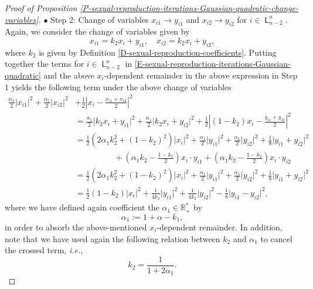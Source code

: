 \documentclass[reqno]{amsart}
\DeclareMathOperator{\Level}{\mathsf{L}}
\numberwithin{equation}{section}
\begin{document}
{\begin{proof}[Proof of Proposition \ref{P-sexual-reproduction-iterations-Gaussian-quadratic-change-variables}]
$\bullet$ {\sc Step 2}: Change of variables $x_{i1}\rightarrow y_{i1}$ and $x_{i2}\rightarrow y_{i2}$ for $i\in \Level_{n-2}^n$.\\
Again, we consider the change of variables given by
$$
x_{i1}=k_2x_i+y_{i1},\quad x_{i2}=k_2x_i+y_{i2},
$$
where $k_2$ is given by Definition \ref{D-sexual-reproduction-coefficients}. Putting together the terms for $i\in \Level_{n-2}^n$ in \eqref{E-sexual-reproduction-iterations-Gaussian-quadratic} and the above $x_i$-dependent remainder in the above expression in {\sc Step 1} yields the following term under the above change of variables
\begin{align*}
\frac{\alpha_1}{2}\vert x_{i1}\vert^2+\frac{\alpha_1}{2}\vert x_{i2}\vert^2&+\frac{1}{2}\left\vert x_i-\frac{x_{i1}+x_{i2}}{2}\right\vert^2\\
&=\frac{\alpha_1}{2}\vert k_2x_i+y_{i1}\vert^2+\frac{\alpha_1}{2}\vert k_2 x_i+y_{i2}\vert^2+\frac{1}{2}\left\vert (1-k_2)x_i-\frac{y_{i1}+y_{i2}}{2}\right\vert^2\\
&=\frac{1}{2}\left(2\alpha_1 k_2^2+(1-k_2)^2\right)\vert x_i\vert^2+\frac{\alpha_1}{2}\vert y_{i1}\vert^2+\frac{\alpha_1}{2}\vert y_{i2}\vert^2+\frac{1}{8}\vert y_{i1}+y_{i2}\vert^2\\
&\hspace{2cm} +\left(\alpha_1 k_2-\frac{1-k_2}{2}\right)x_i\cdot y_{i1}+\left(\alpha_1 k_2-\frac{1-k_2}{2}\right)x_i\cdot y_{i2}\\
&=\frac{1}{2}\left(2\alpha_1 k_2^2+(1-k_2)^2\right)\vert x_i\vert^2+\frac{\alpha_1}{2}\vert y_{i1}\vert^2+\frac{\alpha_1}{2}\vert y_{i2}\vert^2+\frac{1}{8}\vert y_{i1}+y_{i2}\vert^2\\
&=\frac{1}{2}(1-k_2)\vert x_i\vert^2+\frac{1}{4 k_2}\vert y_{i1}\vert^2+\frac{1}{4 k_2}\vert y_{i2}\vert^2-\frac{1}{8}\vert y_{i1}-y_{i2}\vert^2,
\end{align*}
where we have defined again coefficient the $\alpha_1\in \mathbb{R}_+^*$ by
$$\alpha_1:=1+\alpha-k_1,$$
in order to absorb the above-mentioned $x_i$-dependent remainder. In addition, note that we have used again the following relation between $k_2$ and $\alpha_1$ to cancel the crossed term, {\em i.e.},
$$k_2=\frac{1}{1+2\alpha_1}.$$

\medskip


\end{proof}}
\end{document}
